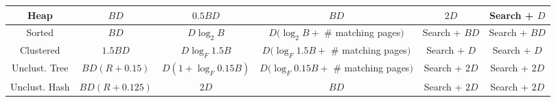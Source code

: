 \documentclass[landscape,8pt]{extarticle}
\begin{document}
\begin{multicols}{4}
\begin{center}
\begin{adjustbox}{angle=270}
\begin{tabular}{ | c | c | c | c | c | c | }
                Heap          & $BD$          & $0.5 BD$              & $BD$                                     & $2D$          & Search + $D$  \\ \hline
                Sorted        & $BD$          & $D \log_2 B$          & $D(\log_2 B +$ \# matching pages$)$      & Search + $BD$ & Search + $BD$ \\ \hline
                Clustered     & $1.5 BD$      & $D \log_F 1.5 B$      & $D(\log_F 1.5B + $ \# matching pages$)$  & Search + $D$  & Search + $D$  \\ \hline
                Unclust. Tree & $BD(R+0.15)$  & $D(1 + \log_F 0.15B)$ & $D(\log_F 0.15B + $ \# matching pages$)$ & Search + $2D$ & Search + $2D$ \\ \hline
                Unclust. Hash & $BD(R+0.125)$ & $2D$                  & $BD$                                     & Search + $2D$ & Search + $2D$ \\ \hline
            \end{tabular}
        \end{adjustbox}
    \end{center}
\end{multicols}
\end{document}
